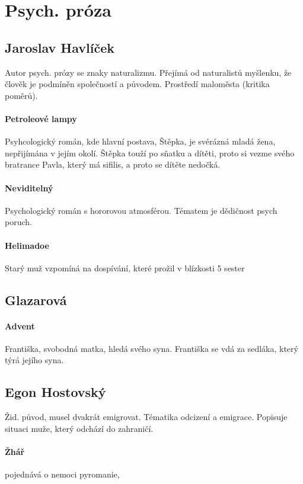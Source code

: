 \documentclass[10pt,a4page,headings,openany,%
oneside
,twocolumn
]{report}
\begin{document}
\section{Psych. próza}

\subsection{Jaroslav Havlíček}
Autor psych. prózy se znaky naturalizmu. Přejímá od naturalistů myšlenku, že člověk je podmíněn společností a původem. Prostředí maloměsta (kritika poměrů). 
\paragraph{Petroleové lampy} Psyhcologický román, kde hlavní postava, Štěpka, je svérázná mladá žena, nepřijímána v jejím okolí. Štěpka touží po sňatku a dítěti, proto si vezme svého bratrance Pavla, který má sifilis, a proto se dítěte nedočká.

\paragraph{Neviditelný} Psychologický román s hororovou atmosférou. Tématem je dědičnost psych poruch. 

\paragraph{Helimadoe} Starý muž vzpomíná na dospívání, které prožil v blízkosti 5 sester

\subsection{Glazarová}

\paragraph{Advent} Františka, svobodná matka, hledá svého syna. Františka se vdá za sedláka, který týrá jejího syna.

\subsection{Egon Hostovský}
Žid. původ, musel dvakrát emigrovat. Tématika odcizení a emigrace. Popisuje situaci muže, který odchází do zahraničí.

\paragraph{Žhář} pojednává o nemoci pyromanie,
\end{document}
